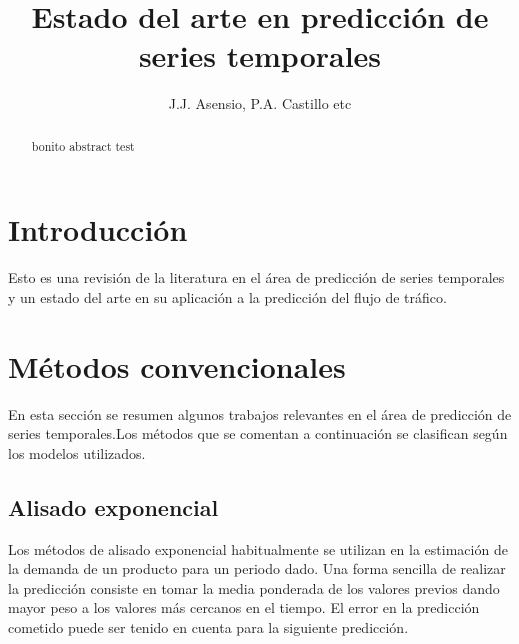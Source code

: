 \documentclass{llncs}
\begin{document}

\title{Estado del arte en predicción de series temporales}


\author{J.J. Asensio, P.A. Castillo etc}


\maketitle
%
%
\begin{abstract} 
bonito abstract test
\end{abstract}


%
%
\section{Introducción}
\label{sec:intro}

Esto es una revisión de la literatura en el área de predicción de series temporales y un estado del arte en su aplicación a la predicción del flujo de tráfico.


\section{Métodos convencionales}

En esta sección se resumen algunos trabajos relevantes en el área de predicción de series temporales.Los métodos que se comentan a continuación se clasifican según los modelos utilizados. 

\subsection{Alisado exponencial}

Los métodos de alisado exponencial habitualmente se utilizan en la estimación de la demanda de un producto para un periodo dado. Una forma sencilla de realizar la predicción consiste en tomar la media ponderada de los valores previos dando mayor peso a los valores más cercanos en el tiempo. El error en la predicción cometido puede ser tenido en cuenta para la siguiente predicción.
\end{document}
